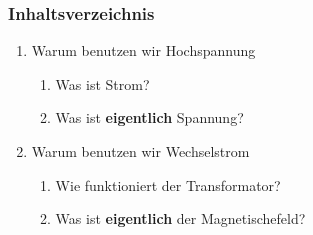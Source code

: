 \begin{frame}[plain]
\frametitle{Inhaltsverzeichnis}
\begin{enumerate}
\item Warum benutzen wir Hochspannung
\begin{enumerate} 
	\item Was ist Strom?
	\item Was ist \textbf{eigentlich} Spannung?
\end{enumerate}
\item Warum benutzen wir Wechselstrom
\begin{enumerate}
	\item Wie funktioniert der Transformator?
	\item Was ist \textbf{eigentlich} der Magnetischefeld?
\end{enumerate}
\end{enumerate}
\end{frame}
